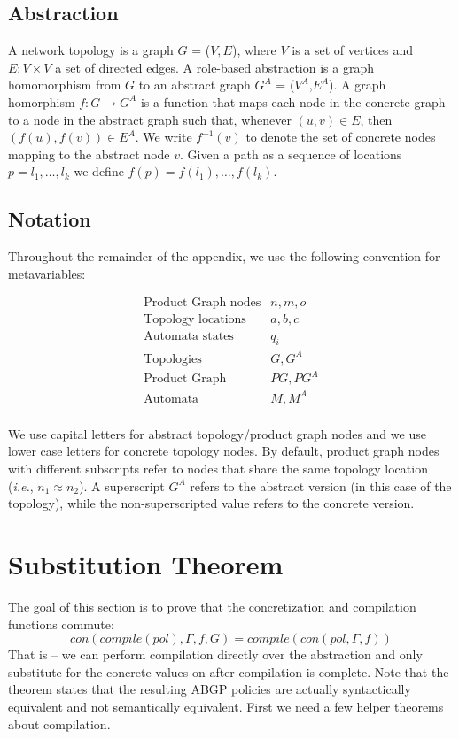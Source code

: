 \documentclass[twocolumn, openany]{sig-alternate-10pt}
\newcommand{\IE}{\emph{i.e.}}
\begin{document}
\subsection{Abstraction}

A network topology is a graph $G$ = ($V, E$), where $V$ is a set of vertices and $E \colon V \times V$ a set of directed edges. A role-based abstraction is a graph homomorphism from $G$ to an abstract graph $G^A$ = ($V^A$,$E^A$). A graph homorphism $f : G \rightarrow G^A$ is a function that maps each node in the concrete graph to a node in the abstract graph such that, whenever $(u,v) \in E$, then $(f(u),f(v)) \in E^A$. We write $f^{-1}(v)$ to denote the set of concrete nodes mapping to the abstract node $v$. Given a path as a sequence of locations $p = l_1, \dots, l_k$ we define $f(p) = f(l_1), \dots, f(l_k)$.


\subsection{Notation}

Throughout the remainder of the appendix, we use the following convention for metavariables:

\[ \begin{array}{ll}
  \text{Product Graph nodes} & n,m,o \\
  \text{Topology locations} & a,b,c \\
  \text{Automata states} & q_i \\
  \text{Topologies} & G, G^A \\
  \text{Product Graph} & PG, PG^A \\
  \text{Automata} & M, M^A \\
\end{array} \]

We use capital letters for abstract topology/product graph nodes and we use lower case letters for concrete topology nodes. By default, product graph nodes with different subscripts refer to nodes that share the same topology location (\IE, $n_1 \approx n_2$). A superscript $G^A$ refers to the abstract version (in this case of the topology), while the non-superscripted value refers to the concrete version.


\section{Substitution Theorem}

The goal of this section is to prove that the concretization and compilation functions commute: 
$$con(compile(pol),\Gamma,f,G) = compile(con(pol,\Gamma,f))$$ 
That is -- we can perform compilation directly over the abstraction and only substitute for the concrete values on after compilation is complete. Note that the theorem states that the resulting ABGP policies are actually syntactically equivalent and not semantically equivalent. First we need a few helper theorems about compilation.
\end{document}
